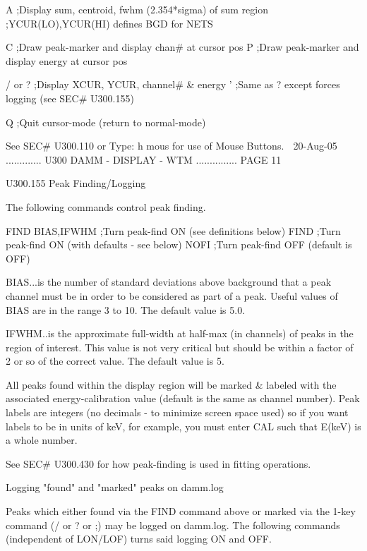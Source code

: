    A              ;Display sum, centroid, fwhm (2.354*sigma) of sum region
                  ;YCUR(LO),YCUR(HI) defines BGD for NETS
 
   C              ;Draw peak-marker and display chan#  at cursor pos
   P              ;Draw peak-marker and display energy at cursor pos
 
   / or ?         ;Display XCUR, YCUR, channel# & energy
   '              ;Same as ? except forces logging (see SEC# U300.155)
 
   Q              ;Quit cursor-mode (return to normal-mode)
 
   See SEC# U300.110 or Type: h mous for use of Mouse Buttons.
    
   20-Aug-05 ............. U300  DAMM - DISPLAY - WTM ............... PAGE  11
 
   U300.155  Peak Finding/Logging
 
   The following commands control peak finding.
 
   FIND BIAS,IFWHM     ;Turn peak-find ON  (see definitions below)
   FIND                ;Turn peak-find ON  (with defaults - see below)
   NOFI                ;Turn peak-find OFF (default is OFF)
 
   BIAS...is the number of standard deviations above background  that  a  peak
          channel  must be in order to be considered as part of a peak. Useful
          values of BIAS are in the range 3 to 10. The default value is 5.0.
 
   IFWHM..is the approximate full-width at half-max (in channels) of peaks  in
          the  region  of interest. This value is not very critical but should
          be within a factor of 2 or so of  the  correct  value.  The  default
          value is 5.
 
   All  peaks  found  within  the display region will be marked & labeled with
   the associated energy-calibration value (default is  the  same  as  channel
   number).  Peak  labels are integers (no decimals - to minimize screen space
   used) so if you want labels to be in units of keV, for  example,  you  must
   enter CAL such that E(keV) is a whole number.
 
   See SEC# U300.430 for how peak-finding is used in fitting operations.
 
   Logging "found" and "marked" peaks on damm.log
 
   Peaks  which  either  found  via  the  FIND command above or marked via the
   1-key command (/ or ? or ;)  may  be  logged  on  damm.log.  The  following
   commands (independent of LON/LOF) turns said logging ON and OFF.
 
